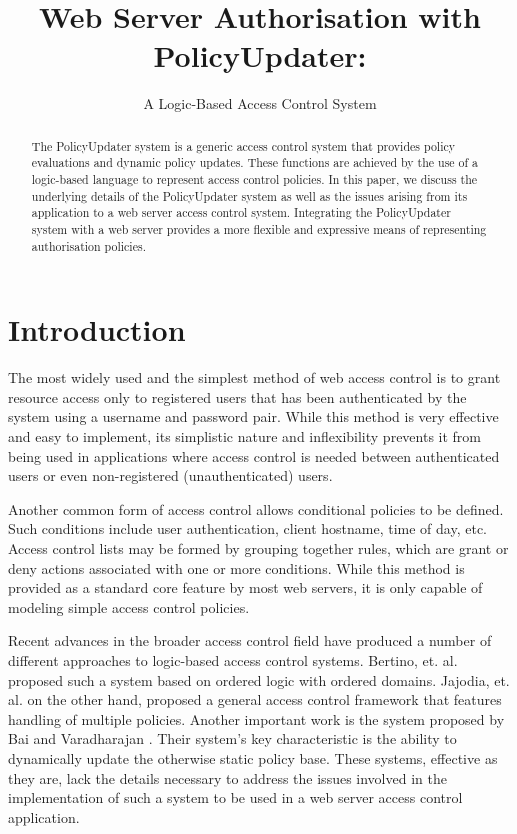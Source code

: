 \documentclass[11pt]{llncs}
\begin{document}
  \title{Web Server Authorisation with PolicyUpdater:}
  \subtitle{A Logic-Based Access Control System}

  \maketitle

  \begin{abstract}
    The PolicyUpdater system is a generic access control system
    that provides policy evaluations and dynamic policy updates. These
    functions are achieved by the use of a logic-based language to represent
    access control policies. In this paper, we discuss the underlying details
    of the PolicyUpdater system as well as the issues arising from its
    application to a web server access control system. Integrating the
    PolicyUpdater system with a web server provides a more flexible and
    expressive means of representing authorisation policies.
  \end{abstract}

  \section{Introduction}

    The most widely used and the simplest method of web access control is to
    grant resource access only to registered users that has been authenticated
    by the system using a username and password pair. While this method is very
    effective and easy to implement, its simplistic nature and inflexibility
    prevents it from being used in applications where access control is needed
    between authenticated users or even non-registered (unauthenticated) users.

    Another common form of access control allows conditional policies to be
    defined. Such conditions include user authentication, client hostname, time
    of day, etc. Access control lists may be formed by grouping together rules,
    which are grant or deny actions associated with one or more conditions.
    While this method is provided as a standard core feature by most web
    servers, it is only capable of modeling simple access control policies.

    Recent advances in the broader access control field have produced a number
    of different approaches to logic-based access control systems. Bertino, et.
    al. \cite{BE1} proposed such a system based on ordered logic with ordered
    domains. Jajodia, et. al. \cite{JAJ} on the other hand, proposed a general
    access control framework that features handling of multiple policies.
    Another important work is the system proposed by Bai and Varadharajan
    \cite{BA1,BA2}. Their system's key characteristic is the ability to
    dynamically update the otherwise static policy base. These systems,
    effective as they are, lack the details necessary to address the issues
    involved in the implementation of such a system to be used in a web server
    access control application.
\end{document}
